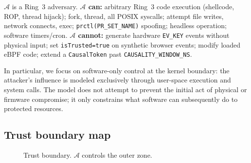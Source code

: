\documentclass[11pt,a4paper,twoside]{article}
\begin{document}
$\mathcal{A}$ is a Ring~3 adversary. \textbf{$\mathcal{A}$ can:}
arbitrary Ring~3 code execution (shellcode, ROP, thread hijack);
fork, thread, all POSIX syscalls; attempt file writes, network connects, exec;
\texttt{prctl(PR\_SET\_NAME)} spoofing; headless operation; software timers/cron.
\textbf{$\mathcal{A}$ cannot:}
generate hardware \texttt{EV\_KEY} events without physical input;
set \texttt{isTrusted=true} on synthetic browser events;
modify loaded eBPF code;
extend a \texttt{CausalToken} past \texttt{CAUSALITY\_WINDOW\_NS}.

In particular, we focus on software-only control at the kernel boundary: the
attacker's influence is modeled exclusively through user-space execution and system
calls. The model does not attempt to prevent the initial act of physical or firmware
compromise; it only constrains what software can subsequently do to protected resources.

\subsection{Trust boundary map}

\begin{figure}[H]
\centering
{}
\caption{Trust boundary. $\mathcal{A}$ controls the outer zone.}
\end{figure}
\end{document}
